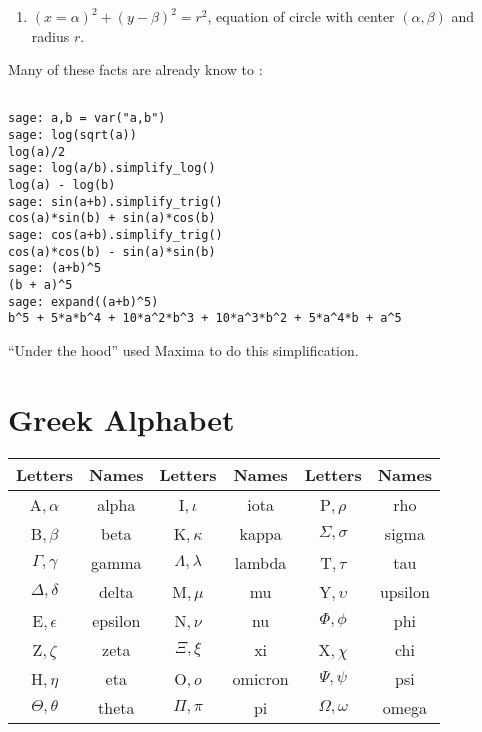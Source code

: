 \begin{enumerate}
\item
$\left(x = \alpha\right)^2 + \left(y - \beta\right)^2 = r^2$, equation of circle with center $\left(\alpha,\beta\right)$ and radius $r$.

\end{enumerate}

Many of these facts are already know to \SAGE:

\begin{Verbatim}[fontsize=\scriptsize,fontfamily=courier,fontshape=tt,frame=single,label=\SAGE]

sage: a,b = var("a,b")
sage: log(sqrt(a))
log(a)/2
sage: log(a/b).simplify_log()
log(a) - log(b)
sage: sin(a+b).simplify_trig()
cos(a)*sin(b) + sin(a)*cos(b)
sage: cos(a+b).simplify_trig()
cos(a)*cos(b) - sin(a)*sin(b)
sage: (a+b)^5
(b + a)^5
sage: expand((a+b)^5)
b^5 + 5*a*b^4 + 10*a^2*b^3 + 10*a^3*b^2 + 5*a^4*b + a^5

\end{Verbatim}

\noindent
``Under the hood'' \SAGE used Maxima to do this simplification.

\section{Greek Alphabet}
\label{sec:1:2:greek-alphabet}

\begin{center}
\begin{tabular}{cc|cc|cc}
{\bf Letters}     & {\bf Names} & {\bf Letters}     & {\bf Names} & {\bf Letters}   & {\bf Names} \\ \hline
A$,\alpha$        & alpha       & I$,\iota$         & iota        & P$,\rho$        & rho         \\
B$,\beta$         & beta        & K$,\kappa$        & kappa       & $\Sigma,\sigma$ & sigma       \\
$\Gamma, \gamma$  & gamma       & $\Lambda,\lambda$ & lambda      & T$,\tau$        & tau         \\
$\Delta,\delta$   & delta       & M$,\mu$           & mu          & Y$,\upsilon$    & upsilon     \\
E$,\epsilon$      & epsilon     & N$, \nu$          & nu          & $\Phi,\phi$     & phi         \\
Z$,\zeta$         & zeta        & $\Xi,\xi$         & xi          & X$,\chi$        & chi         \\
H$,\eta$          & eta         & O$,o$             & omicron     & $\Psi,\psi$     & psi         \\
$\Theta,\theta$   & theta       & $\Pi,\pi$         & pi          & $\Omega,\omega$ & omega       \\
\end{tabular}
\end{center}

